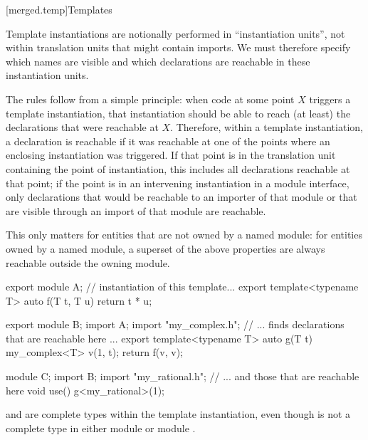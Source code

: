 [merged.temp]{Templates}

\pnum
Template instantiations are notionally performed in ``instantiation units'',
not within translation units that might contain imports.
We must therefore specify
which names are visible and
which declarations are reachable
in these instantiation units.

\pnum
The rules follow from a simple principle:
when code at some point $X$ triggers a template instantiation,
that instantiation should be able to reach (at least)
the declarations that were reachable at $X$.
Therefore, within a template instantiation,
a declaration is reachable if
it was reachable at one of the points where
an enclosing instantiation was triggered.
If that point is in the translation unit
containing the point of instantiation,
this includes all declarations reachable
at that point;
if the point is in an intervening instantiation
in a module interface,
only declarations that would be reachable
to an importer of that module
or that are visible through an import of that module
are reachable.
\begin{note}
This only matters for entities that are
not owned by a named module:
for entities owned by a named module,
a superset of the above properties
are always reachable outside the owning module.
\end{note}

\pnum
\begin{example}
\begin{codeblock}
export module A;
// instantiation of this template...
export template<typename T> auto f(T t, T u) {
  return t * u;
}
\end{codeblock}

\begin{codeblock}
export module B;
import A;
import "my_complex.h";
// ... finds declarations that are reachable here ...
export template<typename T> auto g(T t) {
  my_complex<T> v(1, t);
  return f(v, v);
}
\end{codeblock}

\begin{codeblock}
module C;
import B;
import "my_rational.h";
// ... and those that are reachable here
void use() {
  g<my_rational>(1);
}
\end{codeblock}

 and  are complete
types within the template instantiation,
even though
 is not a complete type
in either module  or module .
\end{example}

